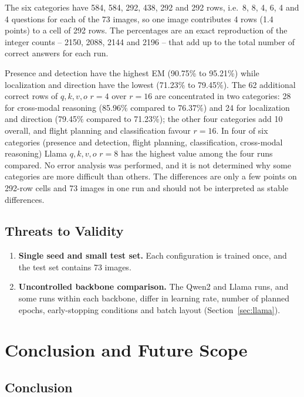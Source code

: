 \documentclass[conference]{IEEEtran}
\begin{document}
The six categories have 584, 584, 292, 438, 292 and 292 rows, i.e.\ 8, 8, 4, 6, 4 and 4 questions for each of the 73 images, so one image contributes 4 rows (1.4 points) to a cell of 292 rows. The percentages are an exact reproduction of the integer counts -- 2150, 2088, 2144 and 2196 -- that add up to the total number of correct answers for each run.

Presence and detection have the highest EM (90.75\% to 95.21\%) while localization and direction have the lowest (71.23\% to 79.45\%). The 62 additional correct rows of $q,k,v,o$ $r=4$ over $r=16$ are concentrated in two categories: 28 for cross-modal reasoning (85.96\% compared to 76.37\%) and 24 for localization and direction (79.45\% compared to 71.23\%); the other four categories add 10 overall, and flight planning and classification favour $r=16$. In four of six categories (presence and detection, flight planning, classification, cross-modal reasoning) Llama $q,k,v,o$ $r=8$ has the highest value among the four runs compared. No error analysis was performed, and it is not determined why some categories are more difficult than others. The differences are only a few points on 292-row cells and 73 images in one run and should not be interpreted as stable differences.

\subsection{Threats to Validity}

\begin{enumerate}[leftmargin=*, itemsep=1pt, topsep=2pt, parsep=0pt]
  \item \textbf{Single seed and small test set.} Each configuration is trained once, and the test set contains 73 images.
  \item \textbf{Uncontrolled backbone comparison.} The Qwen2 and Llama runs, and some runs within each backbone, differ in learning rate, number of planned epochs, early-stopping conditions and batch layout (Section~\ref{sec:llama}).
\end{enumerate}

\section{Conclusion and Future Scope}

\subsection{Conclusion}
\end{document}
